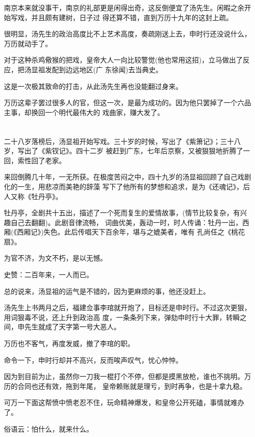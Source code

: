 \documentclass[11pt,a4paper,onecolumn]{article}
\begin{document}
南京本来就没事干，南京的礼部更是闲得出奇，这反倒便宜了汤先生。闲暇之余开始写戏，并且颇有建树，日子过
得还算不错，直到万历十九年的这封上疏。

很明显，汤先生的政治高度比不上艺术高度，奏疏刚送上去，申时行还没说什么，万历就动手了。

对于这种杀鸡儆猴的把戏，皇帝大人一向比较警觉(他也常用这招)，立马做出了反应，把汤显祖发配到边远地区(广
东徐闻)去当典史。

这是一次极其致命的打击，从此汤先生再也没能翻过身来。

万历这辈子罢过很多人的官，但这一次，是最为成功的。因为他只罢掉了一个六品主事，却换回一个明代最伟大的
戏曲家，赚大发了。

\section[\thesection]{}

二十八岁落榜后，汤显祖开始写戏。三十岁的时候，写出了《紫箫记》；三十八岁，写出了《紫钗记》。四十二岁
被赶到广东，七年后京察，又被狠狠地折腾了一回，索性回了老家。

来回倒腾几十年，一无所获。在极度苦闷之中，四十九岁的汤显祖回顾了自己戏剧化的一生，用悲凉而美艳的辞藻
写下了他所有的梦想和追求，是为《还魂记》，后人又称《牡丹亭》。

牡丹亭，全剧共十五出，描述了一个死而复生的爱情故事，(情节比较复杂，有兴趣自己去翻翻)。此剧音律流畅，
词曲优美，轰动一时，时人传诵：牡丹一出，西厢(《西厢记》)失色。此后传唱天下百余年，堪与之媲美者，唯有
孔尚任之《桃花扇》。

为官不济，为文不朽，是以无憾。

史赞：二百年来，一人而已。

总的说来，汤显祖的运气是不错的，因为更麻烦的事，他还没赶上。

汤先生上书两月之后，福建佥事李琯就开炮了，目标还是申时行。不过这次更狠，用词狠毒不说，还上升到政治高
度，一条条列下来，弹劾申时行十大罪，转瞬之间，申先生就成了天字第一号大恶人。

万历也不客气，再度发威，撤了李琯的职。

命令一下，申时行却并不高兴，反而唉声叹气，忧心忡忡。

因为到目前为止，虽然你一刀我一棍打个不停，但都是摸黑放枪，谁也不挑明。万历的合同也还有效，拖到年尾，
皇帝赖账就是理亏，到时再争，也是十拿九稳。

可万一下面这帮愤中愤老忍不住，玩命精神爆发，和皇帝公开死磕，事情就难办了。

俗语云：怕什么，就来什么。
\end{document}
